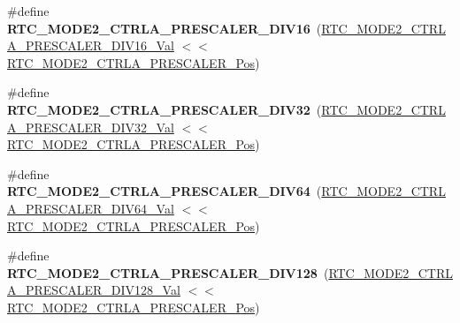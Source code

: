 \begin{DoxyCompactItemize}
\item 
\hypertarget{group___s_a_m_l21___r_t_c_gaaeee444e69730e5fd7e40adf1e06dc43}{}\#define {\bfseries R\+T\+C\+\_\+\+M\+O\+D\+E2\+\_\+\+C\+T\+R\+L\+A\+\_\+\+P\+R\+E\+S\+C\+A\+L\+E\+R\+\_\+\+D\+I\+V16}~(\hyperlink{group___s_a_m_l21___r_t_c_ga5b2c19e964c1bfafba111fde43ba2796}{R\+T\+C\+\_\+\+M\+O\+D\+E2\+\_\+\+C\+T\+R\+L\+A\+\_\+\+P\+R\+E\+S\+C\+A\+L\+E\+R\+\_\+\+D\+I\+V16\+\_\+\+Val} $<$$<$ \hyperlink{group___s_a_m_l21___r_t_c_ga8ceb43a4478f656d6288fabd99a094fb}{R\+T\+C\+\_\+\+M\+O\+D\+E2\+\_\+\+C\+T\+R\+L\+A\+\_\+\+P\+R\+E\+S\+C\+A\+L\+E\+R\+\_\+\+Pos})\label{group___s_a_m_l21___r_t_c_gaaeee444e69730e5fd7e40adf1e06dc43}

\item 
\hypertarget{group___s_a_m_l21___r_t_c_ga5d3a6a3a2490c916f0b712a7b6195c78}{}\#define {\bfseries R\+T\+C\+\_\+\+M\+O\+D\+E2\+\_\+\+C\+T\+R\+L\+A\+\_\+\+P\+R\+E\+S\+C\+A\+L\+E\+R\+\_\+\+D\+I\+V32}~(\hyperlink{group___s_a_m_l21___r_t_c_ga20825b05f4fb2a2ba8f28e680e68e27d}{R\+T\+C\+\_\+\+M\+O\+D\+E2\+\_\+\+C\+T\+R\+L\+A\+\_\+\+P\+R\+E\+S\+C\+A\+L\+E\+R\+\_\+\+D\+I\+V32\+\_\+\+Val} $<$$<$ \hyperlink{group___s_a_m_l21___r_t_c_ga8ceb43a4478f656d6288fabd99a094fb}{R\+T\+C\+\_\+\+M\+O\+D\+E2\+\_\+\+C\+T\+R\+L\+A\+\_\+\+P\+R\+E\+S\+C\+A\+L\+E\+R\+\_\+\+Pos})\label{group___s_a_m_l21___r_t_c_ga5d3a6a3a2490c916f0b712a7b6195c78}

\item 
\hypertarget{group___s_a_m_l21___r_t_c_gabf82d16fb546ec19c91fe0529a7e195d}{}\#define {\bfseries R\+T\+C\+\_\+\+M\+O\+D\+E2\+\_\+\+C\+T\+R\+L\+A\+\_\+\+P\+R\+E\+S\+C\+A\+L\+E\+R\+\_\+\+D\+I\+V64}~(\hyperlink{group___s_a_m_l21___r_t_c_ga07d7831d434d5ff93490902f9d32503b}{R\+T\+C\+\_\+\+M\+O\+D\+E2\+\_\+\+C\+T\+R\+L\+A\+\_\+\+P\+R\+E\+S\+C\+A\+L\+E\+R\+\_\+\+D\+I\+V64\+\_\+\+Val} $<$$<$ \hyperlink{group___s_a_m_l21___r_t_c_ga8ceb43a4478f656d6288fabd99a094fb}{R\+T\+C\+\_\+\+M\+O\+D\+E2\+\_\+\+C\+T\+R\+L\+A\+\_\+\+P\+R\+E\+S\+C\+A\+L\+E\+R\+\_\+\+Pos})\label{group___s_a_m_l21___r_t_c_gabf82d16fb546ec19c91fe0529a7e195d}

\item 
\hypertarget{group___s_a_m_l21___r_t_c_ga4e0be6504826b4687b25d93cd549f4b6}{}\#define {\bfseries R\+T\+C\+\_\+\+M\+O\+D\+E2\+\_\+\+C\+T\+R\+L\+A\+\_\+\+P\+R\+E\+S\+C\+A\+L\+E\+R\+\_\+\+D\+I\+V128}~(\hyperlink{group___s_a_m_l21___r_t_c_ga1fedec5db921fce3c06f6b573b3ebd2e}{R\+T\+C\+\_\+\+M\+O\+D\+E2\+\_\+\+C\+T\+R\+L\+A\+\_\+\+P\+R\+E\+S\+C\+A\+L\+E\+R\+\_\+\+D\+I\+V128\+\_\+\+Val} $<$$<$ \hyperlink{group___s_a_m_l21___r_t_c_ga8ceb43a4478f656d6288fabd99a094fb}{R\+T\+C\+\_\+\+M\+O\+D\+E2\+\_\+\+C\+T\+R\+L\+A\+\_\+\+P\+R\+E\+S\+C\+A\+L\+E\+R\+\_\+\+Pos})\label{group___s_a_m_l21___r_t_c_ga4e0be6504826b4687b25d93cd549f4b6}


\end{DoxyCompactItemize}
